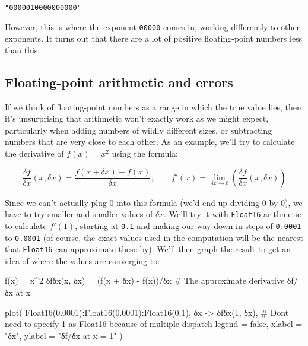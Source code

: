 \documentclass[
  letterpaper,
  DIV=11,
  numbers=noendperiod]{scrreprt}
\newenvironment{Shaded}{\begin{snugshade}}{\end{snugshade}}
\newcommand{\CommentTok}[1]{\textcolor[rgb]{0.37,0.37,0.37}{#1}}
\newcommand{\ConstantTok}[1]{\textcolor[rgb]{0.56,0.35,0.01}{#1}}
\newcommand{\FloatTok}[1]{\textcolor[rgb]{0.68,0.00,0.00}{#1}}
\newcommand{\FunctionTok}[1]{\textcolor[rgb]{0.28,0.35,0.67}{#1}}
\newcommand{\NormalTok}[1]{\textcolor[rgb]{0.00,0.23,0.31}{#1}}
\newcommand{\OperatorTok}[1]{\textcolor[rgb]{0.37,0.37,0.37}{#1}}
\newcommand{\StringTok}[1]{\textcolor[rgb]{0.13,0.47,0.30}{#1}}
\begin{document}
\begin{verbatim}
"0000010000000000"
\end{verbatim}

However, this is where the exponent \texttt{00000} comes in, working
differently to other exponents. It turns out that there are a lot of
positive floating-point numbers less than this.

\hypertarget{floating-point-arithmetic-and-errors}{%
\subsection{Floating-point arithmetic and
errors}\label{floating-point-arithmetic-and-errors}}

If we think of floating-point numbers as a range in which the true value
lies, then it's unsurprising that arithmetic won't exactly work as we
might expect, particularly when adding numbers of wildly different
sizes, or subtracting numbers that are very close to each other. As an
example, we'll try to calculate the derivative of \(f(x) = x^2\) using
the formula:

\[
\frac{\delta f}{\delta x}(x, \delta x) = \frac{f(x + \delta x) - f(x)}{\delta x}, \qquad f'(x) = \lim_{\delta x \to 0} \left( \frac{\delta f}{\delta x}(x, \delta x) \right)
\]

Since we can't actually plug \(0\) into this formula (we'd end up
dividing \(0\) by \(0\)), we have to try smaller and smaller values of
\(\delta x\). We'll try it with \texttt{Float16} arithmetic to calculate
\(f'(1)\), starting at \texttt{0.1} and making our way down in steps of
\texttt{0.0001} to \texttt{0.0001} (of course, the exact values used in
the computation will be the nearest that \texttt{Float16} can
approximate these by). We'll then graph the result to get an idea of
where the values are converging to:

\begin{Shaded}
\begin{Highlighting}[]
\FunctionTok{f}\NormalTok{(x) }\OperatorTok{=}\NormalTok{ x}\OperatorTok{\^{}}\FloatTok{2}
\FunctionTok{δfδx}\NormalTok{(x, δx) }\OperatorTok{=}\NormalTok{ (}\FunctionTok{f}\NormalTok{(x }\OperatorTok{+}\NormalTok{ δx) }\OperatorTok{{-}} \FunctionTok{f}\NormalTok{(x))}\OperatorTok{/}\NormalTok{δx }\CommentTok{\# The approximate derivative δf/δx at x}

\FunctionTok{plot}\NormalTok{(}
    \FunctionTok{Float16}\NormalTok{(}\FloatTok{0.0001}\NormalTok{)}\OperatorTok{:}\FunctionTok{Float16}\NormalTok{(}\FloatTok{0.0001}\NormalTok{)}\OperatorTok{:}\FunctionTok{Float16}\NormalTok{(}\FloatTok{0.1}\NormalTok{),}
\NormalTok{    δx }\OperatorTok{{-}\textgreater{}} \FunctionTok{δfδx}\NormalTok{(}\FloatTok{1}\NormalTok{, δx), }\CommentTok{\# Don\textquotesingle{}t need to specify 1 as Float16 because of multiple dispatch}
\NormalTok{    legend }\OperatorTok{=} \ConstantTok{false}\NormalTok{,}
\NormalTok{    xlabel }\OperatorTok{=} \StringTok{"δx"}\NormalTok{,}
\NormalTok{    ylabel }\OperatorTok{=} \StringTok{"δf/δx at x = 1"}
\NormalTok{)}
\end{Highlighting}
\end{Shaded}
\end{document}
